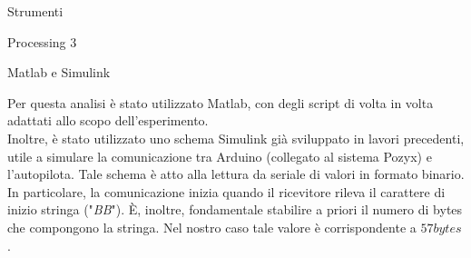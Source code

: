 \documentclass[12pt]{report}
\begin{document}
\begin{section}{Strumenti}
\begin{subsection}{Processing 3}
	\end{subsection}

	\begin{subsection}{Matlab e Simulink}

		Per questa analisi è stato utilizzato Matlab, con degli script di volta in volta adattati allo scopo dell’esperimento.\\ 
		Inoltre, è stato utilizzato uno schema Simulink già sviluppato in lavori precedenti, utile a simulare la comunicazione tra Arduino (collegato al sistema Pozyx) e l'autopilota. Tale schema è atto alla lettura da seriale di valori in formato binario. In particolare, la comunicazione inizia quando il ricevitore rileva il carattere 			di inizio stringa ("\textit{BB}"). È, inoltre, fondamentale stabilire a priori il numero di bytes che compongono la stringa. Nel nostro caso tale valore è corrispondente a $57bytes$. 

	\end{subsection}

	\end{section}
	\newpage
\end{document}
